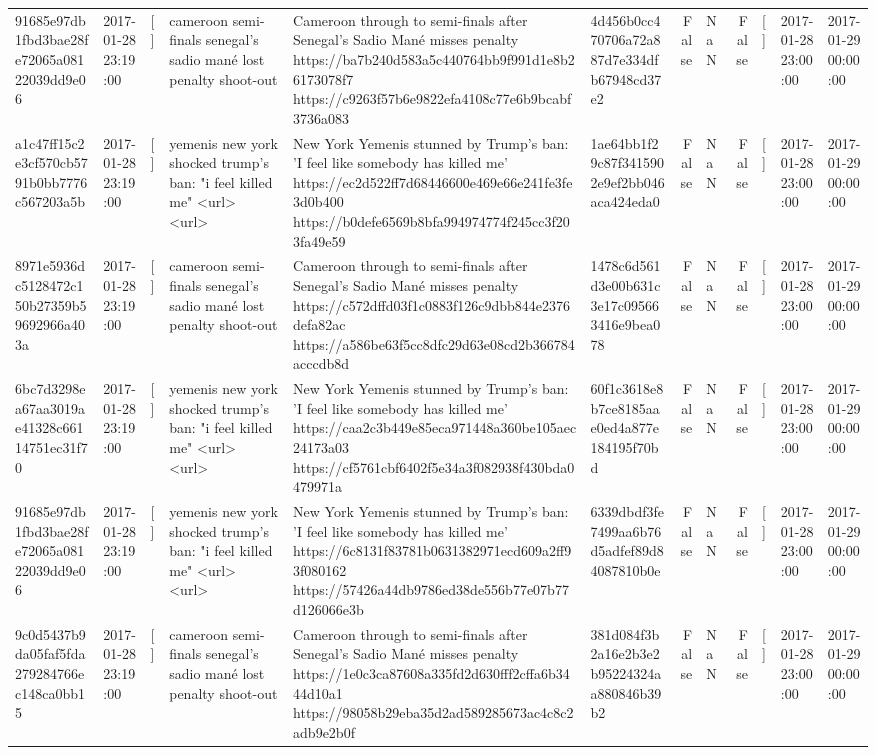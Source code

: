\begin{tabular}{llllllrlrlll}
91685e97db1fbd3bae28fe72065a08122039dd9e06 & 2017-01-28 23:19:00 & [] & cameroon semi-finals senegal's sadio mané lost penalty shoot-out & Cameroon through to semi-finals after Senegal’s Sadio Mané misses penalty https://ba7b240d583a5c440764bb9f991d1e8b26173078f7 https://c9263f57b6e9822efa4108c77e6b9bcabf3736a083 & 4d456b0cc470706a72a887d7e334dfb67948cd37e2 & False & NaN & False & [] & 2017-01-28 23:00:00 & 2017-01-29 00:00:00 \\
a1c47ff15c2e3cf570cb5791b0bb7776c567203a5b & 2017-01-28 23:19:00 & [] & yemenis new york shocked trump's ban: "i feel killed me" <url> <url> & New York Yemenis stunned by Trump's ban: 'I feel like somebody has killed me' https://ec2d522ff7d68446600e469e66e241fe3fe3d0b400 https://b0defe6569b8bfa994974774f245cc3f203fa49e59 & 1ae64bb1f29c87f3415902e9ef2bb046aca424eda0 & False & NaN & False & [] & 2017-01-28 23:00:00 & 2017-01-29 00:00:00 \\
8971e5936dc5128472c150b27359b59692966a403a & 2017-01-28 23:19:00 & [] & cameroon semi-finals senegal's sadio mané lost penalty shoot-out & Cameroon through to semi-finals after Senegal’s Sadio Mané misses penalty https://c572dffd03f1c0883f126c9dbb844e2376defa82ac https://a586be63f5cc8dfc29d63e08cd2b366784acccdb8d & 1478c6d561d3e00b631c3e17c095663416e9bea078 & False & NaN & False & [] & 2017-01-28 23:00:00 & 2017-01-29 00:00:00 \\
6bc7d3298ea67aa3019ae41328c66114751ec31f70 & 2017-01-28 23:19:00 & [] & yemenis new york shocked trump's ban: "i feel killed me" <url> <url> & New York Yemenis stunned by Trump's ban: 'I feel like somebody has killed me' https://caa2c3b449e85eca971448a360be105aec24173a03 https://cf5761cbf6402f5e34a3f082938f430bda0479971a & 60f1c3618e8b7ce8185aae0ed4a877e184195f70bd & False & NaN & False & [] & 2017-01-28 23:00:00 & 2017-01-29 00:00:00 \\
91685e97db1fbd3bae28fe72065a08122039dd9e06 & 2017-01-28 23:19:00 & [] & yemenis new york shocked trump's ban: "i feel killed me" <url> <url> & New York Yemenis stunned by Trump's ban: 'I feel like somebody has killed me' https://6c8131f83781b0631382971ecd609a2ff93f080162 https://57426a44db9786ed38de556b77e07b77d126066e3b & 6339dbdf3fe7499aa6b76d5adfef89d84087810b0e & False & NaN & False & [] & 2017-01-28 23:00:00 & 2017-01-29 00:00:00 \\
9c0d5437b9da05faf5fda279284766ec148ca0bb15 & 2017-01-28 23:19:00 & [] & cameroon semi-finals senegal's sadio mané lost penalty shoot-out & Cameroon through to semi-finals after Senegal’s Sadio Mané misses penalty https://1e0c3ca87608a335fd2d630fff2cffa6b3444d10a1 https://98058b29eba35d2ad589285673ac4c8c2adb9e2b0f & 381d084f3b2a16e2b3e2b95224324aa880846b39b2 & False & NaN & False & [] & 2017-01-28 23:00:00 & 2017-01-29 00:00:00 \\

\end{tabular}
